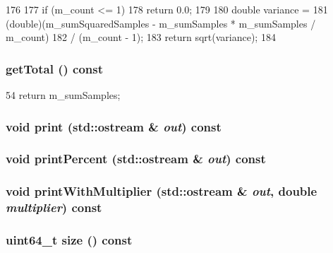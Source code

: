 \begin{DoxyCode}
176 {
177     if (m_count <= 1)
178         return 0.0;
179 
180     double variance =
181         (double)(m_sumSquaredSamples - m_sumSamples * m_sumSamples / m_count)
182         / (m_count - 1);
183     return sqrt(variance);
184 }
\end{DoxyCode}
\hypertarget{classHistogram_a6a790b6f2643bd10f3d74c41d9afefd6}{
\subsubsection[{getTotal}]{ getTotal () const}}
\label{classHistogram_a6a790b6f2643bd10f3d74c41d9afefd6}



\begin{DoxyCode}
54 { return m_sumSamples; }
\end{DoxyCode}
\hypertarget{classHistogram_ac55fe386a101fbae38c716067c9966a0}{
\subsubsection[{print}]{\setlength{\rightskip}{0pt plus 5cm}void print (std::ostream \& {\em out}) const}}
\label{classHistogram_ac55fe386a101fbae38c716067c9966a0}
\hypertarget{classHistogram_a4f76274cefc18a95d39af1c3990880ef}{
\subsubsection[{printPercent}]{\setlength{\rightskip}{0pt plus 5cm}void printPercent (std::ostream \& {\em out}) const}}
\label{classHistogram_a4f76274cefc18a95d39af1c3990880ef}
\hypertarget{classHistogram_ae21abbf3b1ac14430fcb8e0cd64c9764}{
\subsubsection[{printWithMultiplier}]{\setlength{\rightskip}{0pt plus 5cm}void printWithMultiplier (std::ostream \& {\em out}, \/  double {\em multiplier}) const}}
\label{classHistogram_ae21abbf3b1ac14430fcb8e0cd64c9764}
\hypertarget{classHistogram_a0b6868dbef44fc07f11d050eb59e5f7e}{
\subsubsection[{size}]{\setlength{\rightskip}{0pt plus 5cm}uint64\_\-t size () const}}
\label{classHistogram_a0b6868dbef44fc07f11d050eb59e5f7e}




